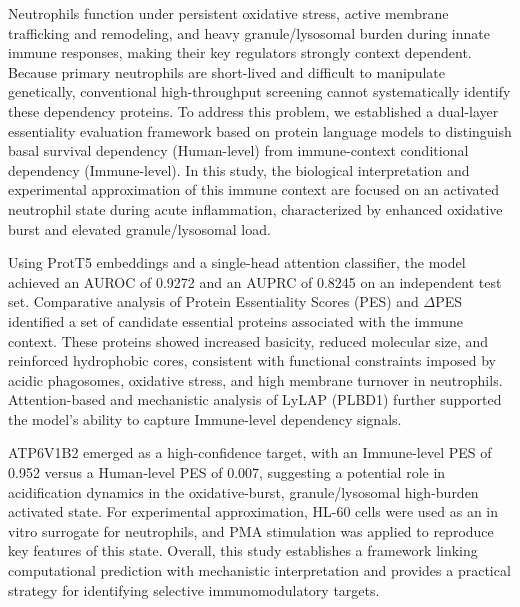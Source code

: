 \begin{abstract*}
Neutrophils function under persistent oxidative stress, active membrane trafficking and remodeling, and heavy granule/lysosomal burden during innate immune responses, making their key regulators strongly context dependent. Because primary neutrophils are short-lived and difficult to manipulate genetically, conventional high-throughput screening cannot systematically identify these dependency proteins. To address this problem, we established a dual-layer essentiality evaluation framework based on protein language models to distinguish basal survival dependency (Human-level) from immune-context conditional dependency (Immune-level). In this study, the biological interpretation and experimental approximation of this immune context are focused on an activated neutrophil state during acute inflammation, characterized by enhanced oxidative burst and elevated granule/lysosomal load.

Using ProtT5 embeddings and a single-head attention classifier, the model achieved an AUROC of 0.9272 and an AUPRC of 0.8245 on an independent test set. Comparative analysis of Protein Essentiality Scores (PES) and $\Delta$PES identified a set of candidate essential proteins associated with the immune context. These proteins showed increased basicity, reduced molecular size, and reinforced hydrophobic cores, consistent with functional constraints imposed by acidic phagosomes, oxidative stress, and high membrane turnover in neutrophils. Attention-based and mechanistic analysis of LyLAP (PLBD1) further supported the model's ability to capture Immune-level dependency signals.

ATP6V1B2 emerged as a high-confidence target, with an Immune-level PES of 0.952 versus a Human-level PES of 0.007, suggesting a potential role in acidification dynamics in the oxidative-burst, granule/lysosomal high-burden activated state. For experimental approximation, HL-60 cells were used as an in vitro surrogate for neutrophils, and PMA stimulation was applied to reproduce key features of this state. Overall, this study establishes a framework linking computational prediction with mechanistic interpretation and provides a practical strategy for identifying selective immunomodulatory targets.

\end{abstract*}

